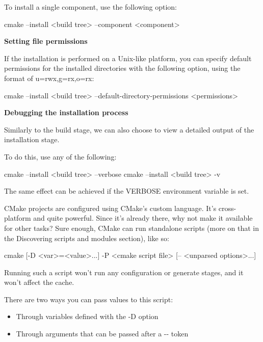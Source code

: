 To install a single component, use the following option:

\begin{shell}
cmake --install <build tree> --component <component>
\end{shell}

\noindent
\textbf{Setting file permissions}

If the installation is performed on a Unix-like platform, you can specify default permissions for the installed directories with the following option, using the format of u=rwx,g=rx,o=rx:

\begin{shell}
cmake --install <build tree>
      --default-directory-permissions <permissions>
\end{shell}

\noindent
\textbf{Debugging the installation process}

Similarly to the build stage, we can also choose to view a detailed output of the installation stage.

To do this, use any of the following:

\begin{shell}
cmake --install <build tree> --verbose
cmake --install <build tree> -v
\end{shell}

The same effect can be achieved if the VERBOSE environment variable is set.


CMake projects are configured using CMake’s custom language. It’s cross-platform and quite powerful. Since it’s already there, why not make it available for other tasks? Sure enough, CMake can run standalone scripts (more on that in the Discovering scripts and modules section), like so:

\begin{shell}
cmake [{-D <var>=<value>}...] -P <cmake script file>
      [-- <unparsed options>...]
\end{shell}

Running such a script won’t run any configuration or generate stages, and it won’t affect the cache.

There are two ways you can pass values to this script:

\begin{itemize}
\item
Through variables defined with the -D option

\item
Through arguments that can be passed after a -{}- token
\end{itemize}

